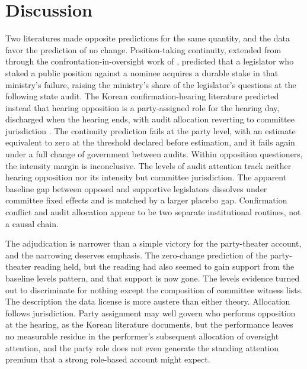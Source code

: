 \documentclass[11pt]{article}
\begin{document}
\section{Discussion}

Two literatures made opposite predictions for the same quantity, and the data favor the prediction of no change. Position-taking continuity, extended from \citet{mayhew1974} through the confrontation-in-oversight work of \citet{eldes2023}, predicted that a legislator who staked a public position against a nominee acquires a durable stake in that ministry's failure, raising the ministry's share of the legislator's questions at the following state audit. The Korean confirmation-hearing literature predicted instead that hearing opposition is a party-assigned role for the hearing day, discharged when the hearing ends, with audit allocation reverting to committee jurisdiction \citep{choi2008, ko2018, yoon2020}. The continuity prediction fails at the party level, with an estimate equivalent to zero at the threshold declared before estimation, and it fails again under a full change of government between audits. Within opposition questioners, the intensity margin is inconclusive. The levels of audit attention track neither hearing opposition nor its intensity but committee jurisdiction. The apparent baseline gap between opposed and supportive legislators dissolves under committee fixed effects and is matched by a larger placebo gap. Confirmation conflict and audit allocation appear to be two separate institutional routines, not a causal chain.

The adjudication is narrower than a simple victory for the party-theater account, and the narrowing deserves emphasis. The zero-change prediction of the party-theater reading held, but the reading had also seemed to gain support from the baseline levels pattern, and that support is now gone. The levels evidence turned out to discriminate for nothing except the composition of committee witness lists. The description the data license is more austere than either theory. Allocation follows jurisdiction. Party assignment may well govern who performs opposition at the hearing, as the Korean literature documents, but the performance leaves no measurable residue in the performer's subsequent allocation of oversight attention, and the party role does not even generate the standing attention premium that a strong role-based account might expect.
\end{document}
